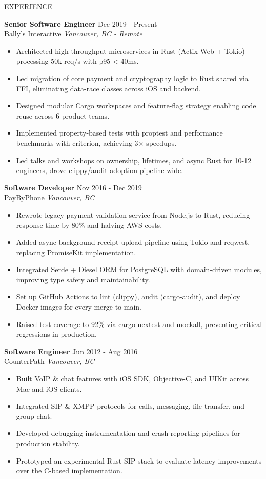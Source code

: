 \documentclass{resume} %
\begin{document}
\begin{rSection}{EXPERIENCE}

\textbf{Senior Software Engineer} \hfill Dec 2019 - Present\\
Bally's Interactive \hfill \textit{Vancouver, BC - Remote}
 \begin{itemize}
    \itemsep -3pt {} 
     \item Architected high-throughput microservices in Rust (Actix-Web + Tokio) processing 50k req/s with p95 < 40ms.
     \item Led migration of core payment and cryptography logic to Rust shared via FFI, eliminating data-race classes across iOS and backend.
     \item Designed modular Cargo workspaces and feature-flag strategy enabling code reuse across 6 product teams.
     \item Implemented property-based tests with proptest and performance benchmarks with criterion, achieving 3× speedups.
     \item Led talks and workshops on ownership, lifetimes, and async Rust for 10-12 engineers, drove clippy/audit adoption pipeline-wide.
 \end{itemize}
 
\textbf{Software Developer} \hfill Nov 2016 - Dec 2019\\
PayByPhone \hfill \textit{Vancouver, BC}
 \begin{itemize}
    \itemsep -3pt {} 
     \item Rewrote legacy payment validation service from Node.js to Rust, reducing response time by 80\% and halving AWS costs.
     \item Added async background receipt upload pipeline using Tokio and reqwest, replacing PromiseKit implementation.
     \item Integrated Serde + Diesel ORM for PostgreSQL with domain-driven modules, improving type safety and maintainability.
     \item Set up GitHub Actions to lint (clippy), audit (cargo-audit), and deploy Docker images for every merge to main.
     \item Raised test coverage to 92\% via cargo-nextest and mockall, preventing critical regressions in production.
 \end{itemize}

\textbf{Software Engineer} \hfill Jun 2012 - Aug 2016\\
CounterPath \hfill \textit{Vancouver, BC}
 \begin{itemize}
    \itemsep -3pt {} 
     \item Built VoIP \& chat features with iOS SDK, Objective-C, and UIKit across Mac and iOS clients.
     \item Integrated SIP \& XMPP protocols for calls, messaging, file transfer, and group chat.
     \item Developed debugging instrumentation and crash-reporting pipelines for production stability.
     \item Prototyped an experimental Rust SIP stack to evaluate latency improvements over the C-based implementation.
 \end{itemize}


\end{rSection}
\end{document}
